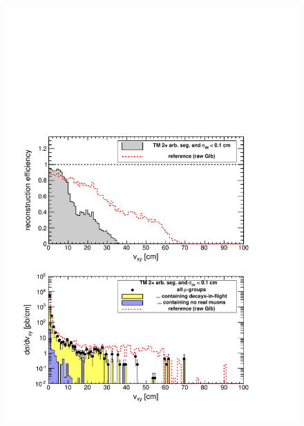 \documentclass[12pt]{article}
\begin{document}
\begin{figure}
\begin{center}
\begin{multicols}{2}
\includegraphics[width=\linewidth]{fig/backgrounds3_plot/dispvert_TrackerSegMatch2DzErr.pdf}


\end{multicols}
\end{center}
\end{figure}
\end{document}
